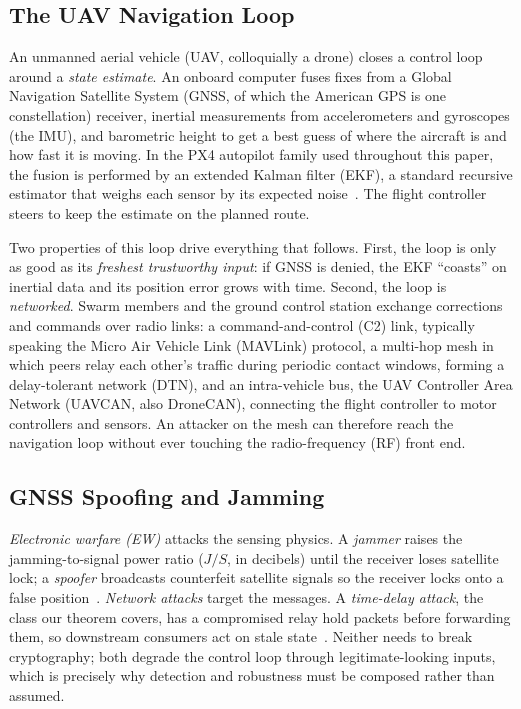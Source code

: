 \subsection{The UAV Navigation Loop}
An unmanned aerial vehicle (UAV, colloquially a drone) closes a control loop
around a \emph{state estimate}. An onboard computer fuses fixes from a Global
Navigation Satellite System (GNSS, of which the American GPS is one
constellation) receiver, inertial measurements from accelerometers and
gyroscopes (the IMU), and barometric height to get a best guess of where the
aircraft is and how fast it is moving. In the PX4 autopilot family used throughout this paper, the fusion is performed by an extended Kalman filter
(EKF), a standard recursive estimator that weighs each sensor by its expected
noise~\cite{kong2024px4ekf}. The flight controller steers to keep the estimate
on the planned route.

Two properties of this loop drive everything that follows. First, the loop is
only as good as its \emph{freshest trustworthy input}: if GNSS is denied, the
EKF ``coasts'' on inertial data and its position error grows with time. Second,
the loop is \emph{networked}. Swarm members and the ground control station
exchange corrections and commands over radio links: a command-and-control (C2) link, typically
speaking the Micro Air Vehicle Link (MAVLink) protocol, a multi-hop mesh in which peers relay each other's traffic
during periodic contact windows, forming a delay-tolerant network (DTN), and an
intra-vehicle bus, the UAV Controller Area Network (UAVCAN, also DroneCAN),
connecting the flight controller to motor controllers and sensors. An attacker on the mesh can therefore reach the
navigation loop without ever touching the radio-frequency (RF) front end.

\subsection{GNSS Spoofing and Jamming}
\emph{Electronic warfare (EW)} attacks the sensing physics. A \emph{jammer}
raises the jamming-to-signal power ratio ($J/S$, in decibels) until the
receiver loses satellite lock; a \emph{spoofer}
broadcasts counterfeit satellite signals so the receiver locks onto a false
position~\cite{humphreys2008assessing,kerns2014capture}. \emph{Network attacks}
target the messages. A \emph{time-delay attack}, the class our theorem
covers, has a compromised relay hold packets before forwarding them, so
downstream consumers act on stale state~\cite{lou2019timedelay,datamut2026}.
Neither needs to break cryptography; both degrade the control loop through
legitimate-looking inputs, which is precisely why detection and robustness must
be composed rather than assumed.

